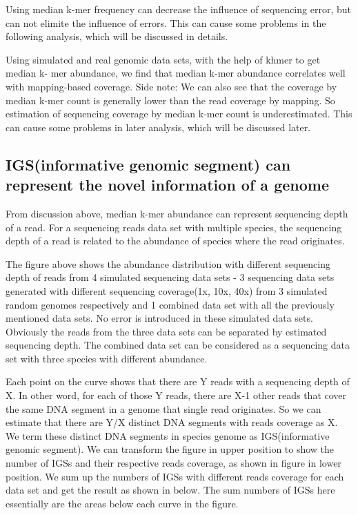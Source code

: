 Using median k-mer frequency can decrease the influence of sequencing error, but can not elimite the influence of errors. This can cause some problems in the following analysis, which will be discussed in details.


Using simulated and real genomic data sets, with the help of khmer to get median k- mer abundance, we find that median k-mer abundance correlates well with mapping-based coverage.
Side note: We can also see that the coverage by median k-mer count is generally lower than the read coverage by mapping. So estimation of sequencing coverage by median k-mer count is underestimated. This can cause some problems in later analysis, which will be discussed later.

\subsection{IGS(informative genomic segment) can represent the novel information of a genome}

From discussion above, median k-mer abundance can represent sequencing depth of a read. For a sequencing reads data set with multiple species, the sequencing depth of a read is related to the abundance of species where the read originates. 


The figure above shows the abundance distribution with different sequencing depth of reads from 4 simulated sequencing data sets - 3 sequencing data sets generated with different sequencing coverage(1x, 10x, 40x) from 3 simulated random genomes respectively and 1 combined data set with all the previously mentioned data sets. No error is introduced in these simulated data sets. Obviously the reads from the three data sets can be separated by estimated sequencing depth. The combined data set can be considered as a sequencing data set with three species with different abundance.

Each point on the curve shows that there are Y reads with a sequencing depth of X. In other word, for each of those Y reads, there are X-1 other reads that cover the same DNA segment in a genome that single read originates. So we can estimate that there are Y/X distinct DNA segments with reads coverage as X. We term these distinct DNA segments in species genome as IGS(informative genomic segment). We can transform the figure in upper position to show the number of IGSs and their respective reads coverage, as shown in figure in lower position. We sum up the numbers of IGSs with different reads coverage for each data set and get the result as shown in below. The sum numbers of IGSs here essentially are the areas below each curve in the figure.

